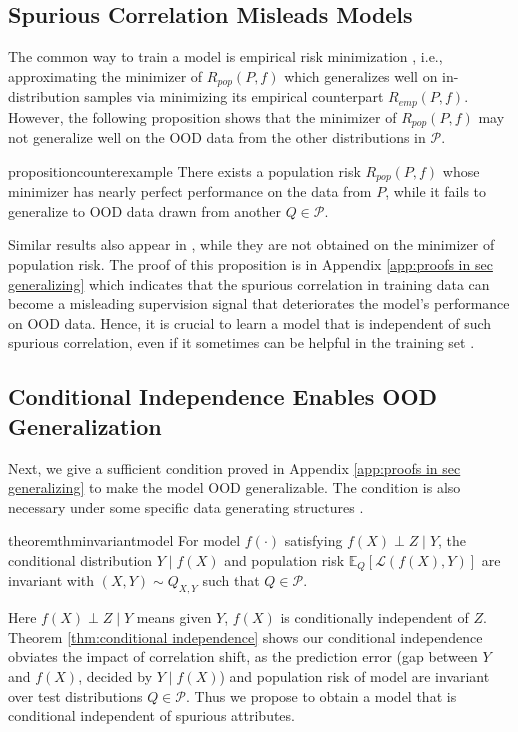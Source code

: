 \documentclass{article} %
\newcommand{\mE}{\mathbb{E}}
\newcommand{\cL}{\mathcal{L}}
\newcommand{\cP}{\mathcal{P}}
\begin{document}
	\subsection{Spurious Correlation Misleads Models}
	The common way to train a model is empirical risk minimization \citep[ERM][]{vapnik1999nature}, i.e., approximating the minimizer of $R_{pop}(P,f)$ which generalizes well on in-distribution samples via minimizing its empirical counterpart $R_{emp}(P, f)$. However, the following proposition shows that the minimizer of $R_{pop}(P,f)$ may not generalize well on the OOD data from the other distributions in $\cP$. 
	\begin{restatable}{proposition}{counterexample}
		\label{pro:counter example}
		There exists a population risk $R_{pop}(P, f)$ whose minimizer has nearly perfect performance on the data from $P$, while it fails to generalize to OOD data drawn from another $Q\in\cP$. 
	\end{restatable}
	Similar results also appear in \citep{xie2020in,krueger2021out}, while they are not obtained on the minimizer of population risk. The proof of this proposition is in Appendix \ref{app:proofs in sec generalizing} which indicates that the spurious correlation in training data can become a misleading supervision signal that deteriorates the model's performance on OOD data. Hence, it is crucial to learn a model that is independent of such spurious correlation, even if it sometimes can be helpful in the training set \citep{xie2020in}.  
	\subsection{Conditional Independence Enables OOD Generalization}
	Next, we give a sufficient condition proved in Appendix \ref{app:proofs in sec generalizing} to make the model OOD generalizable. The condition is also necessary under some specific data generating structures \citep{veitch2021counterfactual}.   
	\begin{restatable}{theorem}{thminvariantmodel}\label{thm:conditional independence}
		For model $f(\cdot)$ satisfying $f(X)\perp Z\!\mid \!Y$, the conditional distribution $Y\mid f(X)$ and population risk $\mE_{Q}[\cL(f(X), Y)]$ are invariant with $(X, Y)\sim Q_{X, Y}$ such that $Q\in \cP$.  
	\end{restatable}
	Here $f(X)\!\!\perp \! Z \! \mid \!Y$ means given $Y$, $f(X)$ is conditionally independent of $Z$. Theorem \ref{thm:conditional independence} shows our conditional independence obviates the impact of correlation shift, as the prediction error (gap between $Y$ and $f(X)$, decided by $Y\!\mid \!f(X)$) and population risk of model are invariant over test distributions $Q\in\cP$. Thus we propose to obtain a model that is conditional independent of spurious attributes.
	
\end{document}
